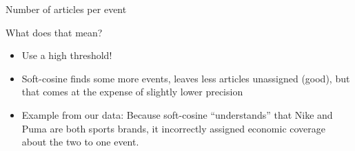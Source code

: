 \begin{frame}{Number of articles per event}
\begin{table}[h]
  \caption{Descriptives for different threshold/similarity combinations\label{tab:thresholds}}
  
  \centering
\end{table}
\end{frame}



\begin{frame}{What does that mean?}
  \begin{itemize}
  \item Use a high threshold!
  \item Soft-cosine finds some more events, leaves less articles unassigned (good), but that comes at the expense of slightly lower precision
  \item Example from our data: Because soft-cosine ``understands'' that Nike and Puma are both sports brands, it incorrectly assigned economic coverage about the two to one event.
  \end{itemize}
\end{frame}





